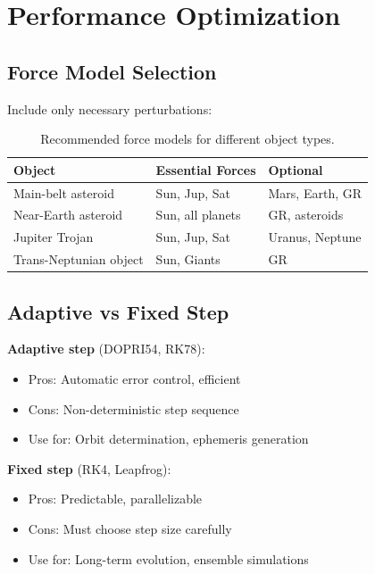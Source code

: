 \section{Performance Optimization}

\subsection{Force Model Selection}

Include only necessary perturbations:

\begin{table}[htbp]
\centering
\small
\begin{tabular}{@{}l p{3cm} p{3.5cm}@{}}
\toprule
\textbf{Object} & \textbf{Essential Forces} & \textbf{Optional} \\
\midrule
Main-belt asteroid & Sun, Jup, Sat & Mars, Earth, GR \\
Near-Earth asteroid & Sun, all planets & GR, asteroids \\
Jupiter Trojan & Sun, Jup, Sat & Uranus, Neptune \\
Trans-Neptunian object & Sun, Giants & GR \\
\bottomrule
\end{tabular}
\caption{Recommended force models for different object types.}
\label{tab:force_models}
\end{table}

\subsection{Adaptive vs Fixed Step}

\textbf{Adaptive step} (DOPRI54, RK78):
\begin{itemize}
    \item Pros: Automatic error control, efficient
    \item Cons: Non-deterministic step sequence
    \item Use for: Orbit determination, ephemeris generation
\end{itemize}

\textbf{Fixed step} (RK4, Leapfrog):
\begin{itemize}
    \item Pros: Predictable, parallelizable
    \item Cons: Must choose step size carefully
    \item Use for: Long-term evolution, ensemble simulations
\end{itemize}

